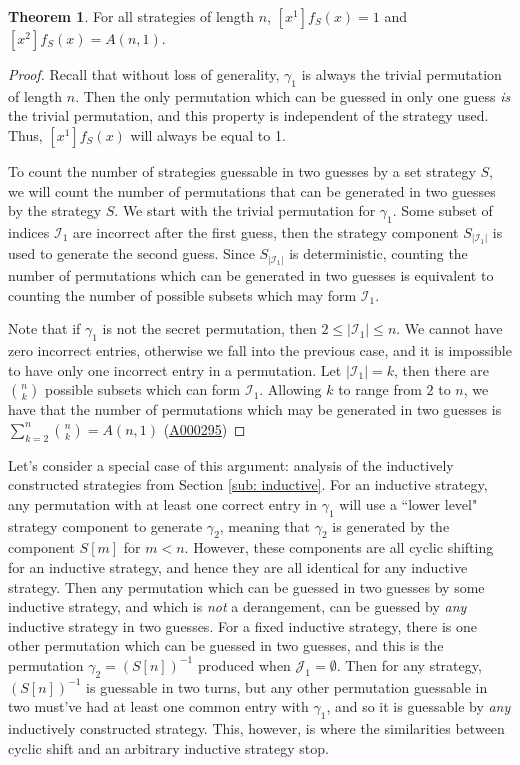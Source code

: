 \documentclass[article]{amsart}
\theoremstyle{definition}
\newtheorem{theorem}{Theorem}[section]
\theoremstyle{definition}
\theoremstyle{remark}
\newcommand{\oeis}[1]{\href{https://oeis.org/#1}{\rm  \underline{#1}}}
\begin{document}
\begin{theorem} \label{thm:linquad}
    For all strategies of length $n$, $[x^1]f_{S}(x) = 1$ and $[x^2]f_{S}(x) = A(n,1)$. 
\end{theorem}

\begin{proof}
Recall that without loss of generality, $\gamma_1$ is always the trivial permutation of length $n$. Then the only permutation which can be guessed in only one guess \textit{is} the trivial permutation, and this property is independent of the strategy used. Thus, $[x^1]f_S(x)$ will always be equal to 1.

To count the number of strategies guessable in two guesses by a set strategy $S$, we will count the number of permutations that can be generated in two guesses by the strategy $S$. We start with the trivial permutation for $\gamma_1$. Some subset of indices $\mathcal{I}_1$ are incorrect after the first guess, then the strategy component $S_{|\mathcal{I}_1|}$ is used to generate the second guess. Since $S_{|\mathcal{I}_1|}$ is deterministic, counting the number of permutations which can be generated in two guesses is equivalent to counting the number of possible subsets which may form $\mathcal{I}_1$. 

Note that if $\gamma_1$ is not the secret permutation, then $2 \leq |\mathcal{I}_1| \leq n$. We cannot have zero incorrect entries, otherwise we fall into the previous case, and it is impossible to have only one incorrect entry in a permutation. Let $|\mathcal{I}_1| = k$, then there are $\binom{n}{k}$ possible subsets which can form $\mathcal{I}_1$. Allowing $k$ to range from $2$ to $n$, we have that the number of permutations which may be generated in two guesses is $\sum_{k=2}^n \binom{n}{k} = A(n,1)$ (\oeis{A000295})
    
\end{proof}

Let's consider a special case of this argument: analysis of the inductively constructed strategies from Section \ref{sub: inductive}. For an inductive strategy, any permutation with at least one correct entry in $\gamma_1$ will use a ``lower level" strategy component to generate $\gamma_2$, meaning that $\gamma_2$ is generated by the component $S[m]$ for $m < n$. However, these components are all cyclic shifting for an inductive strategy, and hence they are all identical for any inductive strategy. Then any permutation which can be guessed in two guesses by some inductive strategy, and which is \textit{not} a derangement, can be guessed by \textit{any} inductive strategy in two guesses. For a fixed inductive strategy, there is one other permutation which can be guessed in two guesses, and this is the permutation $\gamma_2 = (S[n])^{-1}$ produced when $\mathcal{J}_1 = \emptyset$. Then for any strategy, $(S[n])^{-1}$ is guessable in two turns, but any other permutation guessable in two must've had at least one common entry with $\gamma_1$, and so it is guessable by \textit{any} inductively constructed strategy. This, however, is where the similarities between cyclic shift and an arbitrary inductive strategy stop.
\end{document}
